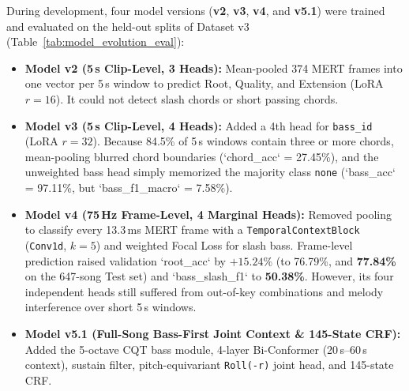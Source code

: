 \documentclass[a4paper]{article}
\begin{document}
During development, four model versions (\textbf{v2}, \textbf{v3}, \textbf{v4}, and \textbf{v5.1}) were trained and evaluated on the held-out splits of Dataset v3 (Table~\ref{tab:model_evolution_eval}):
\begin{itemize}
    \item \textbf{Model v2 (5\,s Clip-Level, 3 Heads):} Mean-pooled 374 MERT frames into one vector per 5\,s window to predict Root, Quality, and Extension (LoRA $r=16$). It could not detect slash chords or short passing chords.
    \item \textbf{Model v3 (5\,s Clip-Level, 4 Heads):} Added a 4th head for \texttt{bass\_id} (LoRA $r=32$). Because 84.5\% of 5\,s windows contain three or more chords, mean-pooling blurred chord boundaries (`chord\_acc` = 27.45\%), and the unweighted bass head simply memorized the majority class \texttt{none} (`bass\_acc` = 97.11\%, but `bass\_f1\_macro` = 7.58\%).
    \item \textbf{Model v4 (75\,Hz Frame-Level, 4 Marginal Heads):} Removed pooling to classify every 13.3\,ms MERT frame with a \texttt{TemporalContextBlock} (\texttt{Conv1d}, $k=5$) and weighted Focal Loss for slash bass. Frame-level prediction raised validation `root\_acc` by $+15.24\%$ (to 76.79\%, and \textbf{77.84\%} on the 647-song Test set) and `bass\_slash\_f1` to \textbf{50.38\%}. However, its four independent heads still suffered from out-of-key combinations and melody interference over short 5\,s windows.
    \item \textbf{Model v5.1 (Full-Song Bass-First Joint Context \& 145-State CRF):} Added the 5-octave CQT bass module, 4-layer Bi-Conformer (20\,s--60\,s context), sustain filter, pitch-equivariant \texttt{Roll(-r)} joint head, and 145-state CRF.
\end{itemize}
\end{document}
